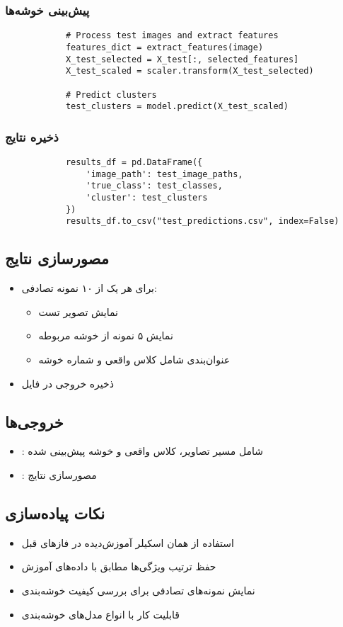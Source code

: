 \documentclass[a4paper,12pt]{article}
\begin{document}
	\subsubsection{پیش‌بینی خوشه‌ها}
	\begin{latin}
		\begin{verbatim}
			# Process test images and extract features
			features_dict = extract_features(image)
			X_test_selected = X_test[:, selected_features]
			X_test_scaled = scaler.transform(X_test_selected)
			
			# Predict clusters
			test_clusters = model.predict(X_test_scaled)
		\end{verbatim}
	\end{latin}
	
	\subsubsection{ذخیره نتایج}
	\begin{latin}
		\begin{verbatim}
			results_df = pd.DataFrame({
				'image_path': test_image_paths,
				'true_class': test_classes,
				'cluster': test_clusters
			})
			results_df.to_csv("test_predictions.csv", index=False)
		\end{verbatim}
	\end{latin}
	
	\subsection{مصورسازی نتایج}
	\begin{itemize}
		\item برای هر یک از ۱۰ نمونه تصادفی:
		\begin{itemize}
			\item نمایش تصویر تست
			\item نمایش ۵ نمونه از خوشه مربوطه
			\item عنوان‌بندی شامل کلاس واقعی و شماره خوشه
		\end{itemize}
		\item ذخیره خروجی در فایل 
	\end{itemize}
	
	\subsection{خروجی‌ها}
	\begin{itemize}
		\item {}: شامل مسیر تصاویر، کلاس واقعی و خوشه پیش‌بینی شده
		\item {}: مصورسازی نتایج
	\end{itemize}
	
	\subsection{نکات پیاده‌سازی}
	\begin{itemize}
		\item استفاده از همان اسکیلر آموزش‌دیده در فازهای قبل
		\item حفظ ترتیب ویژگی‌ها مطابق با داده‌های آموزش
		\item نمایش نمونه‌های تصادفی برای بررسی کیفیت خوشه‌بندی
		\item قابلیت کار با انواع مدل‌های خوشه‌بندی
	\end{itemize}
\end{document}
